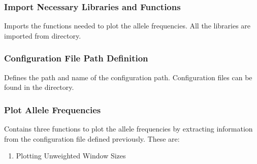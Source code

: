 \documentclass[letterpaper,10pt,english]{sphinxhowto}
\begin{document}
\subsubsection{Import Necessary Libraries and Functions}
\label{\detokenize{index:import-necessary-libraries-and-functions}}
\sphinxAtStartPar
Imports the functions needed to plot the allele frequencies. All the libraries are imported from  directory.

\begin{sphinxVerbatim}[commandchars=\\\{\}]
 \PYG{p}{[} \PYG{p}{]}    
\end{sphinxVerbatim}


\subsubsection{Configuration File Path Definition}
\label{\detokenize{index:configuration-file-path-definition}}
\sphinxAtStartPar
Defines the path and name of the configuration path. Configuration files can be found in the  directory.

\begin{sphinxVerbatim}[commandchars=\\\{\}]
 \PYG{p}{[} \PYG{p}{]}   
\end{sphinxVerbatim}


\subsubsection{Plot Allele Frequencies}
\label{\detokenize{index:plot-allele-frequencies}}
\sphinxAtStartPar
Contains three functions to plot the allele frequencies by extracting information from the configuration file defined previously. These are:
\begin{enumerate}
%
\item {} 
\sphinxAtStartPar
Plotting Unweighted Window Sizes

\end{enumerate}

\begin{sphinxVerbatim}[commandchars=\\\{\}]
 \PYG{p}{[} \PYG{p}{]} 
\end{sphinxVerbatim}
\end{document}
